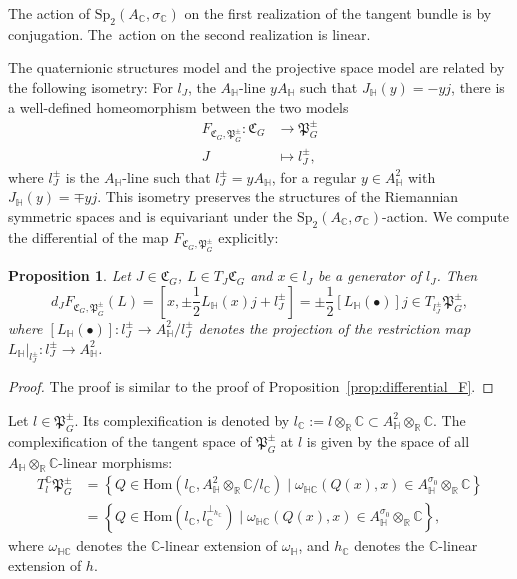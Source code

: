 \documentclass[oneside,11pt]{amsart}
\newtheorem{prop}[thm]{Proposition}
\theoremstyle{definition}
\theoremstyle{remark}
\numberwithin{thm}{section}
\numberwithin{equation}{section}
\begin{document}
The action of $\mathrm{Sp}_2(A_\mathbb{C},\sigma_\mathbb{C})$ on the first realization of the tangent bundle is by conjugation. The~action on the second realization is linear.

The quaternionic structures model and the projective space model are related by the following isometry: 
For $l_J$, the $A_{\mathbb{H}}$-line $yA_{\mathbb{H}}$ such that $J_\mathbb{H}(y)=-yj$, there is a well-defined homeomorphism between the two models 
\begin{align}\label{homeo_quatern_proj}
F_{\mathfrak{C}_G,\mathfrak{P}_G^\pm}\colon \mathfrak{C}_G & \to \mathfrak{P}_G^\pm \\
J & \mapsto l_{J}^\pm,
\end{align}
where $l_J^\pm$ is the $A_{\mathbb{H}}$-line such that $l_J^\pm=yA_{\mathbb{H}}$, for a regular $y\in A_\mathbb H^2$ with $J_\mathbb{H}(y)=\mp yj$. This isometry preserves the structures of the Riemannian symmetric spaces and is equivariant under the $\mathrm{Sp}_2 (A_\mathbb C, \sigma_\mathbb C)$-action.
We compute the differential of the map $F_{\mathfrak{C}_G,\mathfrak{P}_G^\pm}$ explicitly:

\begin{prop}\label{prop:differential_F_quat}
    Let $J\in\mathfrak{C}_G$, $L\in T_J\mathfrak{C}_G$ and $x\in l_J$ be a generator of $l_J$. Then
    $$d_{J}F_{\mathfrak{C}_G,\mathfrak{P}_G^\pm}(L)=[x,\pm\frac{1}{2}L_\mathbb H(x)j+l_J^\pm]=\pm\frac{1}{2}[L_\mathbb H(\bullet)]j\in T_{l_J^\pm}\mathfrak{P}_G^\pm,$$
    where $[L_\mathbb H(\bullet)]\colon l_J^\pm\to A^2_\mathbb H/l_J^\pm$ denotes the projection of the restriction map $L_\mathbb H|_{l_J^\pm}\colon l_J^\pm\to A^2_\mathbb H$.
\end{prop}

\begin{proof} The proof is similar to the proof of Proposition~\ref{prop:differential_F}.
\end{proof}

Let $l\in\mathfrak{P}_G^\pm$. Its complexification is denoted by $l_\mathbb C:=l\otimes_\mathbb R\mathbb C\subset A_\mathbb H^2\otimes_\mathbb R \mathbb C$. The complexification of the tangent space of $\mathfrak P_G^\pm$ at $l$ is given by the space of all $A_\mathbb H\otimes_\mathbb R \mathbb C$-linear morphisms:
\begin{align*}
T_l^\mathbb C\mathfrak{P}_G^\pm
&=\left\{Q\in\mathrm{Hom}(l_\mathbb C,A_\mathbb H^2\otimes_\mathbb R\mathbb C/l_\mathbb C)\mid \omega_{\mathbb H\mathbb C}(Q(x),x)\in A^{\sigma_0}_\mathbb H\otimes_\mathbb R\mathbb C\right\}\\
&=\left\{Q\in\mathrm{Hom}(l_\mathbb C,l_\mathbb C^{\perp_{h_\mathbb C}})\mid \omega_{\mathbb H\mathbb C}(Q(x),x)\in A^{\sigma_0}_\mathbb H\otimes_\mathbb R\mathbb C\right\},
\end{align*}
where $\omega_{\mathbb H\mathbb C}$ denotes the $\mathbb C$-linear extension of $\omega_\mathbb H$, and $h_{\mathbb C}$ denotes the $\mathbb C$-linear extension of $h$.
\end{document}
